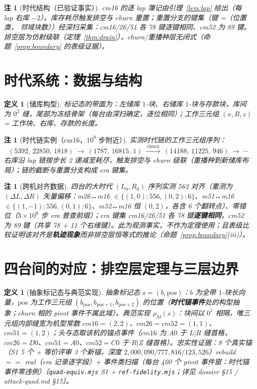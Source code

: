 \documentclass[11pt]{ctexart}
\newtheorem{definition}[theorem]{定义}
\newtheorem{remark}[theorem]{注}
\begin{document}
\begin{remark}[时代结构（已验证事实）]
cm16 的逐 lap 簿记由引理~\ref{lem:lap} 给出（每 lap 右库 $-2$）。库存耗尽触发排空与 churn 重置；重置分支的键集（键 =（位置类， 邻域块数））经深扫采集：cm16/26/51 各 78 键逐键相同、cm52 为 89 键。排空层为仿射级联（定理~\ref{thm:drain}），churn/重播种层无闭式（命题~\ref{prop:boundary} 的表级证据）。
\end{remark}

\section{时代系统：数据与结构}

\begin{definition}[储库构型]
标记态的带面为：左储库 $1$-块、右储库 $1$-块与存款块，库间为 $0^2$ 缝，尾部为冻结骨架（每台由深扫确定，逐位相同）；工作三元组 $(x,R,z)$ = 工作块、右库、存款的长度。
\end{definition}

\begin{remark}[时代链实例（cm16，$10^9$ 步附近）]
实测时代链的工作三元组序列：
\[
(5392,\,22850,\,1818)\ \longrightarrow\ (1787,\,16815,\,1)\ \xrightarrow{\ \text{churn}\ }\ (14188,\,11225,\,946)\ \longrightarrow\ \cdots
\]
右库沿 lap 链按步长 2 递减至耗尽，触发排空与 churn 级联（重播种到新储库布局）；链的截断与重置分支构成 era 键集。
\end{remark}

\begin{remark}[跨机对齐数据]
四台的大时代 $(L_0,R_0)$ 序列实测 562 对齐（重测为 $(\Delta L,\Delta R)$ 矢量偏移：m26↔m16 $\in\{(1,0){:}556,(0,2){:}6\}$、m51↔m16 $\in\{(1,{-}1){:}556,(0,1){:}6\}$、m52↔m16 恒 $(0,2)$，各含 6 个翻转点）、零错位（$3\times10^9$ 步 era 普查前缀）；era 键集 cm16/26/51 各 78 键\textbf{逐键相同}，cm52 为 89 键（共享 78 + 11 个右缘键）。此为观测事实，不作为定理使用；且表级比较证明该对齐是\textbf{轨迹现象}而非排空层恒等式的推论（命题~\ref{prop:boundary}(iii)）。
\end{remark}

\section{四台间的对应：排空层定理与三层边界}\label{sec:corr}

\begin{definition}[抽象标记态与典范实现]\label{def:abstract}
抽象标记态 $s=(b,\mathrm{pos})$：$b$ 为全带 $1$-块长向量，$\mathrm{pos}$ 为工作三元组 $(b_{\mathrm{pos}},b_{\mathrm{pos}+1},b_{\mathrm{pos}+2})$ 的位置（\textbf{时代锚事件}处的构型抽象；churn 相的 pivot 事件不属此域）。典范实现 $\rho_M(s)$：块间以 $0^1$ 相隔，唯三元组内部缝宽为机型常数 $cm16{=}(2,2)$、$cm26{=}cm52{=}(1,1)$、$cm51{=}(1,2)$；头与态取该机的锚点事件（$cm16$ 为 $A0$ 于 $L|R$ 缝首格，$cm26{=}D0$、$cm51{=}A0$、$cm52{=}C0$ 于 $R|Z$ 缝首格）。忠实性证据：8 个真实锚（S1 5 个 + 等价评审 3 个新锚，深度 $2{,}000{,}090/777{,}816/123{,}526$）rebuild $==$ real（era 记录逐字段）+ 事件类扫描（每台 400 个 pivot 事件窗：时代锚事件零违例）〔\texttt{quad-equiv.mjs} S1 + \texttt{ref-fidelity.mjs}；详见 dossier §15 / attack-quad.md §15〕。
\end{definition}
\end{document}
